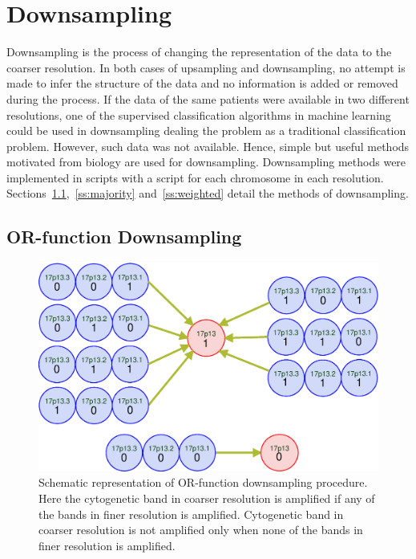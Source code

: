 \section{Downsampling}
\label{s:downsampling}
Downsampling is the process of changing the representation of the data to the coarser resolution. In both cases of upsampling and downsampling, no attempt is made to infer the structure of the data and no information is added or removed during the process. If the data of the same patients were available in two different resolutions, one of the supervised classification algorithms in machine learning could be used in downsampling dealing the problem as a traditional classification problem. However, such data was not available. Hence, simple but useful methods motivated from biology are used for downsampling. Downsampling methods were implemented in scripts with a script for each chromosome in each resolution. Sections~\ref{ss:orfunction},~\ref{ss:majority} and~\ref{ss:weighted} detail the methods of downsampling. %

\subsection{OR-function Downsampling}
\label{ss:orfunction}

\begin{figure}[h!]
\centering
\includegraphics[scale=0.35]{figures/ptmapping}
\caption[OR-function downsampling]{{Schematic representation of OR-function downsampling procedure. Here the cytogenetic band in coarser resolution is amplified if any of the bands in finer resolution is amplified. Cytogenetic band in coarser resolution is not amplified only when none of the bands in finer resolution is amplified.}}\label{Fig:ptmapping}
\end{figure}


